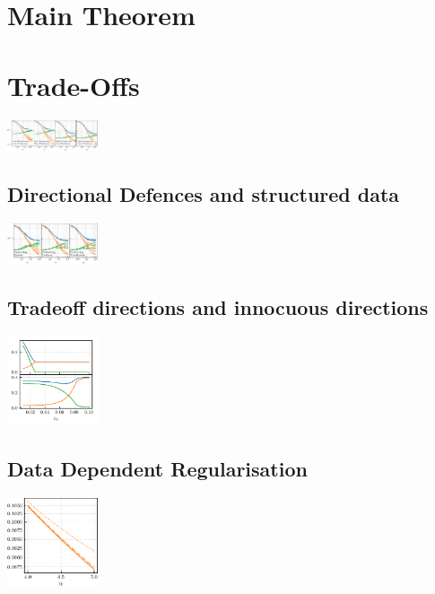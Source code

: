 \documentclass[a0paper,fleqn]{betterportraitposter}
\begin{document}
{\begin{multicols}{3}
\section{Main Theorem}



\section{Trade-Offs}


\includegraphics[width=0.2\textwidth]{Assets/feature_combinations_alpha_sweep.pdf}


\subsection{Directional Defences and structured data}

\includegraphics[width=0.2\textwidth]{Assets/defence_sweep.pdf}


\subsection{Tradeoff directions and innocuous directions}


\includegraphics[width=0.2\textwidth]{Assets/optimal_defense.pdf}


\subsection{Data Dependent Regularisation}

\includegraphics[width=0.2\textwidth]{Assets/gen_lambda_optimal_sweep_alpha.pdf}



\end{multicols}}
\end{document}
